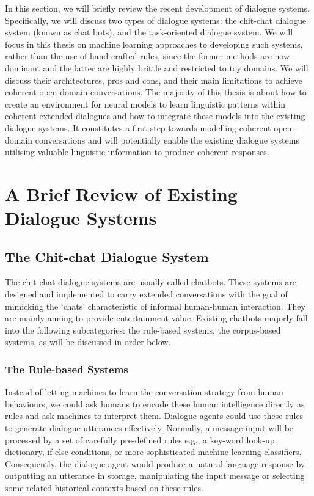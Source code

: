 \documentclass[bsc,frontabs,twoside,singlespacing,parskip,deptreport]{infthesis}     %
\begin{document}
In this section, we will briefly review the recent development of dialogue systems. Specifically, we will discuss two types of dialogue systems: the chit-chat dialogue system (known as chat bots), and the task-oriented dialogue system.  We will focus in this thesis on machine learning approaches to developing such systems, rather than the use of hand-crafted rules, since the former methods are now dominant and the latter are highly brittle and restricted to toy domains. We will discuss their architectures, pros and cons, and their main limitations to achieve coherent open-domain conversations. The majority of this thesis is about how to create an environment for neural models to learn linguistic patterns within coherent extended dialogues and how to integrate these models into the existing dialogue systems. It constitutes a first step towards modelling coherent open-domain conversations and will potentially enable the existing dialogue systems utilising valuable linguistic information to produce coherent responses.

\section {A Brief Review of Existing Dialogue Systems}

\subsection{The Chit-chat Dialogue System}

The chit-chat dialogue systems are usually called chatbots. These systems are designed and implemented to carry extended conversations with the goal of mimicking the ‘chats’ characteristic of informal human-human interaction\cite{jurafsky2019speech}. They are mainly aiming to provide entertainment value. Existing chatbots majorly fall into the following subcategories: the rule-based systems, the corpus-based systems, as will be discussed in order below.

\subsubsection*{The Rule-based Systems}

Instead of letting machines to learn the conversation strategy from human behaviours, we could ask humans to encode these human intelligence directly as rules and ask machines to interpret them. Dialogue agents could use these rules to generate dialogue utterances effectively. Normally, a message input will be processed by a set of carefully pre-defined rules e.g., a key-word look-up dictionary, if-else conditions, or more sophisticated machine learning classifiers\cite{jiweilithesis}. Consequently, the dialogue agent would produce a natural language response by outputting an utterance in storage, manipulating the input message or selecting some related historical contexts based on these rules.
\end{document}

